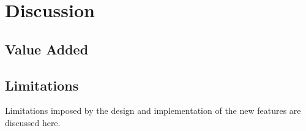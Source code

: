 \chapter{Discussion}





\section{Value Added}

\section{Limitations}
%  
Limitations imposed by the design and implementation of the new features are
discussed here.

